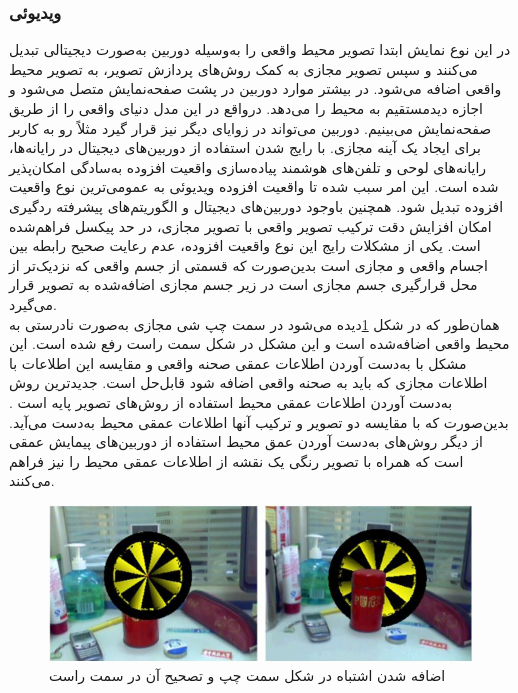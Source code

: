 \subsubsection{ویدیوئی}
در این نوع نمایش ابتدا تصویر محیط واقعی را به‌وسیله دوربین به‌صورت دیجیتالی تبدیل می‌کنند و سپس تصویر مجازی به کمک روش‌های پردازش تصویر، به تصویر محیط واقعی اضافه می‌شود. در بیشتر موارد دوربین در پشت صفحه‌نمایش متصل می‌شود و اجازه دیدمستقیم به محیط را می‌دهد. درواقع در این مدل دنیای واقعی را از طریق صفحه‌نمایش می‌بینیم. دوربین می‌تواند در زوایای دیگر نیز قرار گیرد مثلاً رو به کاربر برای ایجاد یک آینه مجازی\cite{Billinghurst}.
با رایج شدن استفاده از دوربین‌های دیجیتال در رایانه‌ها، رایانه‌های لوحی و تلفن‌های هوشمند پیاده‌سازی واقعیت افزوده به‌سادگی امکان‌پذیر شده است. این امر سبب شده تا واقعیت افزوده ویدیوئی به عمومی‌ترین نوع واقعیت افزوده تبدیل شود. همچنین باوجود دوربین‌های دیجیتال و الگوریتم‌های پیشرفته ردگیری امکان افزایش دقت ترکیب تصویر واقعی با تصویر مجازی، در حد پیکسل فراهم‌شده است. یکی از مشکلات رایج این نوع واقعیت افزوده، عدم رعایت صحیح رابطه بین اجسام واقعی و مجازی است بدین‌صورت که قسمتی از جسم واقعی که نزدیک‌تر از محل قرارگیری جسم مجازی است در زیر جسم مجازی اضافه‌شده به تصویر قرار می‌گیرد\cite{Tian}.
\\
همان‌طور که در شکل \ref{fig:Tian}دیده می‌شود در سمت چپ شی مجازی به‌صورت نادرستی به محیط واقعی اضافه‌شده است و این مشکل در شکل سمت راست رفع شده است. این مشکل با به‌دست آوردن اطلاعات عمقی صحنه واقعی و مقایسه این اطلاعات با اطلاعات مجازی که باید به صحنه واقعی اضافه شود قابل‌حل است. جدیدترین روش به‌دست آوردن اطلاعات عمقی محیط استفاده از روش‌های تصویر پایه است \cite{Billinghurst}.
بدین‌صورت که با مقایسه دو تصویر و ترکیب آنها اطلاعات عمقی محیط به‌دست می‌آید. از دیگر روش‌های به‌دست آوردن عمق محیط استفاده از دوربین‌های پیمایش عمقی است که همراه با تصویر رنگی یک نقشه از اطلاعات عمقی محیط را نیز فراهم می‌کنند.
\begin{figure}
	\centering
	\includegraphics[width=1\linewidth]{image/wrongpic}
	\caption {اضافه شدن اشتباه در شکل سمت چپ و تصحیح آن در سمت راست \cite{Tian}}
	\label{fig:Tian}
\end{figure}


